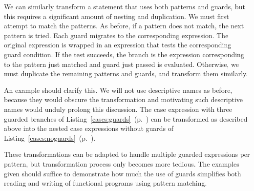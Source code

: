 We can similarly transform a  statement that uses both patterns and guards, but this requires a significant amount of nesting and duplication. We must first attempt to match the patterns. As before, if a pattern does not match, the next pattern is tried. Each guard migrates to the corresponding expression. The original expression is wrapped in an  expression that tests the corresponding guard condition. If the test succeeds, the  branch is the expression corresponding to the pattern just matched and guard just passed is evaluated. Otherwise, we must duplicate the remaining patterns and guards, and transform them similarly.

An example should clarify this. We will not use descriptive names as before, because they would obscure the transformation and motivating such descriptive names would unduly prolong this discussion. The case expression with three guarded branches of Listing~\ref{cases:guards}~(p.~\pageref{cases:guards}) can be transformed as described above into the nested case expressions without guards of Listing~\ref{cases:noguards}~(p.~\pageref{cases:noguards}).

These transformations can be adapted to handle multiple guarded expressions per pattern, but transformation process only becomes more tedious. The examples given should suffice to demonstrate how much the use of guards simplifies both reading and writing of functional programs using pattern matching.


